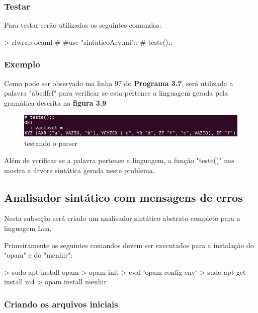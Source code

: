 \documentclass[12pt,a4paper]{report}
\begin{document}
\subsubsection{Testar}

Para testar serão utilizados os seguintes comandos:

\begin{terminal}
> rlwrap ocaml
# #use "sintaticoArv.ml";;
# teste();;
\end{terminal}

\subsubsection{Exemplo}

Como pode ser observado ma linha 97 do \textbf{Programa 3.7}, será utilizada a palavra "abcdfcf" para verificar se esta pertence a linguagem gerada pela gramática descrita na \textbf{figura 3.9}

\begin{figure}[!htb]
\centering
\includegraphics[scale=0.64]{Imagens/teste.png}
\caption{testando o parser}
\label{teste}
\end{figure}

Além de verificar se a palavra pertence a linguagem, a função "teste()" nos mostra a árvore sintática gerada neste problema. 



\subsection{Analisador sintático com mensagens de erros}

Nesta subseção será criado um analisador sintático abstrato completo para a linguagem Lua.

Primeiramente os seguintes comandos devem ser executados para a instalação do "opam" e do "menhir":

\begin{terminal}
> sudo apt install opam
> opam init
> eval `opam config env`
> sudo apt-get install m4
> opam install menhir
\end{terminal}


\subsubsection{Criando os arquivos iniciais}
\end{document}
